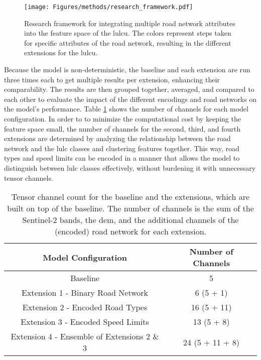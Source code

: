 \begin{figure}[htb]
    \centering  
    \texttt{[image: Figures/methods/research\_framework.pdf]}
    \caption[Research Framework]{Research framework for integrating multiple road network attributes into the feature space of the \gls{lulcu}. The colors represent steps taken for specific attributes of the road network, resulting in the different extensions for the \gls{lulcu}.}
    \label{fig:researchframework}
\end{figure}

Because the model is non-deterministic, the baseline and each extension are run three times each to get multiple results per extension, enhancing their comparability. The results are then grouped together, averaged, and compared to each other to evaluate the impact of the different encodings and road networks on the model's performance. Table \ref{tab:model_configs} shows the number of channels for each model configuration. In order to to minimize the computational cost by keeping the feature space small, the number of channels for the second, third, and fourth extensions are determined by analyzing the relationship between the road network and the \gls{lulc} classes and clustering features together. This way, road types and speed limits can be encoded in a manner that allows the model to distinguish between \gls{lulc} classes effectively, without burdening it with unnecessary tensor channels.

\begin{table}[!htb]
    \centering
    \caption[Tensor Channels of Extensions]{Tensor channel count for the baseline and the extensions, which are built on top of the baseline. The number of channels is the sum of the Sentinel-2 bands, the \gls{dem}, and the additional channels of the (encoded) road network for each extension.}
    \begin{tabular}{cc}
        \toprule
        \textbf{Model Configuration} & \textbf{Number of Channels} \\
        \midrule
        Baseline & 5 \\
        Extension 1 - Binary Road Network & 6 (5 + 1) \\
        Extension 2 - Encoded Road Types & 16 (5 + 11) \\
        Extension 3 - Encoded Speed Limits & 13 (5 + 8) \\
        Extension 4 - Ensemble of Extensions 2 \& 3 & 24 (5 + 11 + 8) \\
        \bottomrule
    \end{tabular}
    \label{tab:model_configs}
\end{table}

